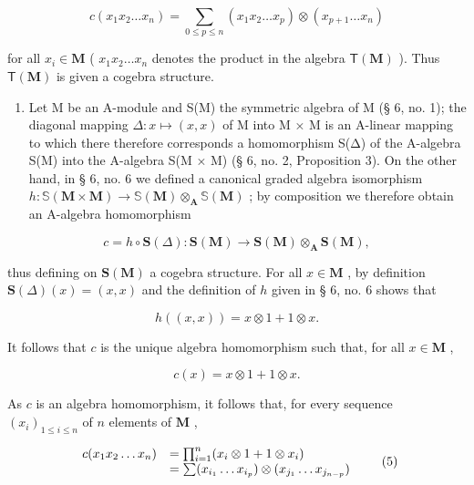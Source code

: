 \[
c (x _ {1} x _ {2} \dots x _ {n}) = \sum_ {0 \leqslant p \leqslant n} (x _ {1} x _ {2} \dots x _ {p}) \otimes (x _ {p + 1} \dots x _ {n})\tag{3}
\]

for all \(x_{i} \in \mathbf{M}\) ( \(x_{1}x_{2}\ldots x_{n}\) denotes the product in the algebra \(\mathsf{T}(\mathbf{M})\) ). Thus \(\mathsf{T}(\mathbf{M})\) is given a cogebra structure.

\begin{enumerate}
\def\labelenumi{(\arabic{enumi})}
\setcounter{enumi}{5}
\tightlist
\item
  Let M be an A-module and S(M) the symmetric algebra of M (§ 6, no. 1); the diagonal mapping \(\Delta: x \mapsto (x, x)\) of M into M × M is an A-linear mapping to which there therefore corresponds a homomorphism S(Δ) of the A-algebra S(M) into the A-algebra S(M × M) (§ 6, no. 2, Proposition 3). On the other hand, in § 6, no. 6 we defined a canonical graded algebra isomorphism \(h \colon \mathbb{S}(\mathbf{M} \times \mathbf{M}) \to \mathbb{S}(\mathbf{M}) \otimes_{\mathbf{A}} \mathbb{S}(\mathbf{M})\) ; by composition we therefore obtain an A-algebra homomorphism
\end{enumerate}

\[
c = h \circ \mathbf {S} (\Delta): \mathbf {S} (\mathbf {M}) \rightarrow \mathbf {S} (\mathbf {M}) \otimes_ {\mathbf {A}} \mathbf {S} (\mathbf {M}),
\]

thus defining on \(\mathbf{S}(\mathbf{M})\) a cogebra structure. For all \(x\in \mathbf{M}\) , by definition \(\mathbf{S}(\Delta)(x) = (x,x)\) and the definition of \(h\) given in § 6, no. 6 shows that

\[
h ((x, x)) = x \otimes 1 + 1 \otimes x.
\]

It follows that \(c\) is the unique algebra homomorphism such that, for all \(x \in \mathbf{M}\) ,

\[
c (x) = x \otimes 1 + 1 \otimes x.\tag{4}
\]

As \(c\) is an algebra homomorphism, it follows that, for every sequence \((x_{i})_{1\leqslant i\leqslant n}\) of \(n\) elements of \(\mathbf{M}\) ,

\[
\begin{array}{r l} c (x _ {1} x _ {2} \dots x _ {n}) & = \prod_ {i = 1} ^ {n} (x _ {i} \otimes 1 + 1 \otimes x _ {i}) \\ & = \sum (x _ {i _ {1}} \dots x _ {i _ {p}}) \otimes (x _ {j _ {1}} \dots x _ {j _ {n - p}}) \end{array}\tag{5}
\]

